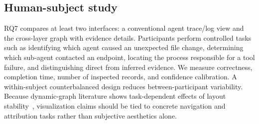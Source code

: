 \subsection{Human-subject study}
RQ7 compares at least two interfaces: a conventional agent trace/log view and the \system cross-layer graph with evidence details. Participants perform controlled tasks such as identifying which agent caused an unexpected file change, determining which sub-agent contacted an endpoint, locating the process responsible for a tool failure, and distinguishing direct from inferred evidence. We measure correctness, completion time, number of inspected records, and confidence calibration. A within-subject counterbalanced design reduces between-participant variability. Because dynamic-graph literature shows task-dependent effects of layout stability~\cite{archambault2011dynamic,archambault2013mentalmap}, visualization claims should be tied to concrete navigation and attribution tasks rather than subjective aesthetics alone.
